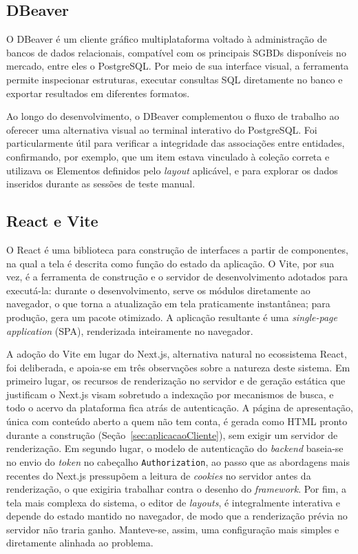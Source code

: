 \subsection{DBeaver}

O DBeaver é um cliente gráfico multiplataforma voltado à administração de bancos de dados relacionais, compatível com os principais SGBDs disponíveis no mercado, entre eles o PostgreSQL. Por meio de sua interface visual, a ferramenta permite inspecionar estruturas, executar consultas SQL diretamente no banco e exportar resultados em diferentes formatos.

Ao longo do desenvolvimento, o DBeaver complementou o fluxo de trabalho ao oferecer uma alternativa visual ao terminal interativo do PostgreSQL. Foi particularmente útil para verificar a integridade das associações entre entidades, confirmando, por exemplo, que um item estava vinculado à coleção correta e utilizava os Elementos definidos pelo \textit{layout} aplicável, e para explorar os dados inseridos durante as sessões de teste manual.

\subsection{React e Vite}

O React é uma biblioteca para construção de interfaces a partir de componentes, na qual a tela é descrita como função do estado da aplicação. O Vite, por sua vez, é a ferramenta de construção e o servidor de desenvolvimento adotados para executá-la: durante o desenvolvimento, serve os módulos diretamente ao navegador, o que torna a atualização em tela praticamente instantânea; para produção, gera um pacote otimizado. A aplicação resultante é uma \textit{single-page application} (SPA), renderizada inteiramente no navegador.

A adoção do Vite em lugar do Next.js, alternativa natural no ecossistema React, foi deliberada, e apoia-se em três observações sobre a natureza deste sistema. Em primeiro lugar, os recursos de renderização no servidor e de geração estática que justificam o Next.js visam sobretudo a indexação por mecanismos de busca, e todo o acervo da plataforma fica atrás de autenticação. A página de apresentação, única com conteúdo aberto a quem não tem conta, é gerada como HTML pronto durante a construção (Seção~\ref{sec:aplicacaoCliente}), sem exigir um servidor de renderização. Em segundo lugar, o modelo de autenticação do \textit{backend} baseia-se no envio do \textit{token} no cabeçalho \texttt{Authorization}, ao passo que as abordagens mais recentes do Next.js pressupõem a leitura de \textit{cookies} no servidor antes da renderização, o que exigiria trabalhar contra o desenho do \textit{framework}. Por fim, a tela mais complexa do sistema, o editor de \textit{layouts}, é integralmente interativa e depende do estado mantido no navegador, de modo que a renderização prévia no servidor não traria ganho. Manteve-se, assim, uma configuração mais simples e diretamente alinhada ao problema.

